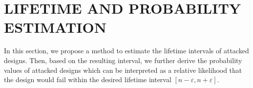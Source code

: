 
\begin{comment}
\section{LIFETIME ESTIMATION}
\label{sec:lt_estimation}
In this section, we propose a method to estimate the lifetime interval of attacked designs, considering the workload variations based on the aforementioned assumption and definition of critical operational mode.

Based on the assumption, the union of critical operational modes of all candidate paths is equivalent to the universal set of operational modes, i.e., all operational modes. Thus, for the purpose of covering all operational modes, we have to consider the severe aging condition of each candidate path, such that the associated critical operational modes are applied to predict the lifetime of other paths using a binary search method.

For example, given the candidate path $i$, the other path $j$, and time variable $t$, the goal of the method is to predict $j's$ lifetime by binarily searching toward a convergent $t$. That is, during the binary search, the timing variable $t$ will be iteratively calibrated according to the $j's$ setup timing constraint, formulated in Equation~(\ref{eq:setup}), and eventually $j's$ lifetime will converge toward the value of $t$. Where $j's$ aging rate is derived by the aging correlation between $i$ and $j$ (i.e., regression equation of $i$ on $j$) and $i's$ aging rate is derived from Equation~(\ref{eq:worst}). 
As a result, when $i$ is considered undergoing severe aging, we can obtain the other paths' lifetimes, among which we choose the smallest one as the lifetime of the attacked design.

In accordance with the former procedure, we can derive one lifetime value of a path being compromised with malicious aging. By considering all candidate paths undergoing severe aging, we can derive a group of lifetime values, among which smallest one and biggest one are the resulting interval based on the attack.
\end{comment}
\section{LIFETIME AND PROBABILITY ESTIMATION}
\label{sec:lt_estimation}
In this section, we propose a method to estimate the lifetime intervals of attacked designs. Then, based on the resulting interval, we further derive the probability values of attacked designs which can be interpreted as a relative likelihood that the design would fail within the desired lifetime interval $[n-\varepsilon, n+\varepsilon]$.
